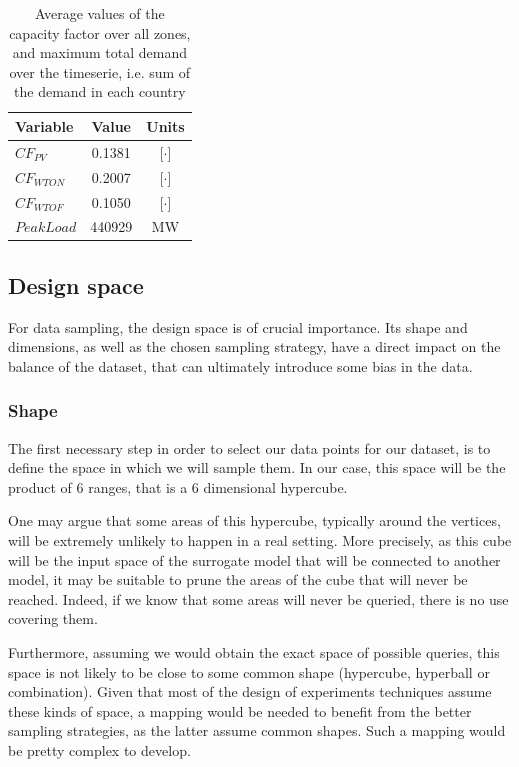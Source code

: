 \begin{table}[h]
    \centering
    \begin{tabular}{|l c c|}
        \hline
        Variable     & Value  & Units \\ \hline
        $CF_{PV}$    & 0.1381 & [$\cdot$]    \\
        $CF_{WTON}$  & 0.2007 & [$\cdot$]    \\
        $CF_{WTOF}$  & 0.1050 & [$\cdot$]    \\ 
        $PeakLoad$   & 440929 & MW    \\ \hline
    \end{tabular}
    \caption{Average values of the capacity factor over all zones, and maximum total demand over the timeserie, i.e. sum of the demand in each country}
    \label{table:param-values}
\end{table}

\subsection{Design space}

For data sampling, the design space is of crucial importance. Its shape and dimensions, as well as the chosen sampling strategy, have a direct impact on the balance of the dataset, that can ultimately introduce some bias in the data. 

\subsubsection{Shape}

The first necessary step in order to select our data points for our dataset, is to define the space in which we will sample them. In our case, this space will be the product of 6 ranges, that is a 6 dimensional hypercube. 

One may argue that some areas of this hypercube, typically around the vertices, will be extremely unlikely to happen in a real setting. More precisely, as this cube will be the input space of the surrogate model that will be connected to another model, it may be suitable to prune the areas of the cube that will never be reached. Indeed, if we know that some areas will never be queried, there is no use covering them.

Furthermore, assuming we would obtain the exact space of possible queries, this space is not likely to be close to some common shape (hypercube, hyperball or combination). Given that most of the design of experiments techniques assume these kinds of space, a mapping would be needed to benefit from the better sampling strategies, as the latter assume common shapes. Such a mapping would be pretty complex to develop.

